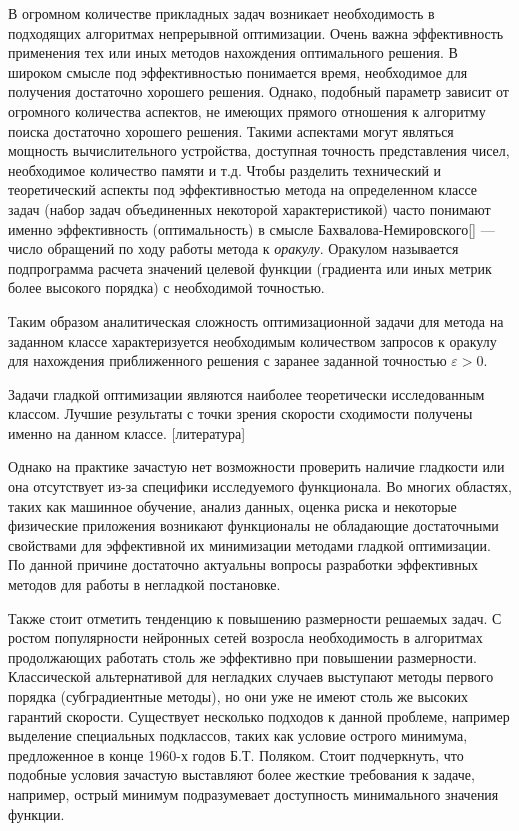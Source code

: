 
{\actuality} 
В огромном количестве прикладных задач возникает необходимость в подходящих алгоритмах непрерывной оптимизации. Очень важна эффективность применения тех или иных методов нахождения оптимального решения. В широком смысле под эффективностью понимается время, необходимое для получения достаточно хорошего решения. Однако, подобный параметр зависит от огромного количества аспектов, не имеющих прямого отношения к алгоритму поиска достаточно хорошего решения. Такими аспектами могут являться мощность вычислительного устройства, доступная точность представления чисел, необходимое количество памяти и т.д. Чтобы разделить технический и теоретический аспекты под эффективностью метода на определенном классе задач (набор задач объединенных некоторой характеристикой) часто понимают именно эффективность (оптимальность) в смысле Бахвалова-Немировского[] --- число обращений по ходу работы метода к \textit{оракулу}. Оракулом называется подпрограмма расчета значений целевой функции (градиента или иных метрик более высокого порядка) с необходимой точностью.

Таким образом аналитическая сложность оптимизационной задачи для метода на заданном классе характеризуется необходимым количеством запросов к оракулу для нахождения приближенного решения с заранее заданной точностью $\varepsilon > 0$.

Задачи гладкой оптимизации являются наиболее теоретически исследованным классом. Лучшие результаты с точки зрения скорости сходимости получены именно на данном классе. [литература] 

Однако на практике зачастую нет возможности проверить наличие гладкости или она отсутствует из-за специфики исследуемого функционала. Во многих областях, таких как машинное обучение, анализ данных, оценка риска и некоторые физические приложения возникают функционалы не обладающие достаточными свойствами для эффективной их минимизации методами гладкой оптимизации. По данной причине достаточно актуальны вопросы разработки эффективных методов для работы в негладкой постановке. 

Также стоит отметить тенденцию к повышению размерности решаемых задач. С ростом популярности нейронных сетей возросла необходимость в алгоритмах продолжающих работать столь же эффективно при повышении размерности. Классической альтернативой для негладких случаев выступают методы первого порядка (субградиентные методы), но они уже не имеют столь же высоких гарантий скорости. Существует несколько подходов к данной проблеме, например выделение специальных подклассов, таких как условие острого минимума, предложенное в конце 1960-х годов Б.Т. Поляком. Стоит подчеркнуть, что подобные условия зачастую выставляют более жесткие требования к задаче, например, острый минимум подразумевает доступность минимального значения функции. 

